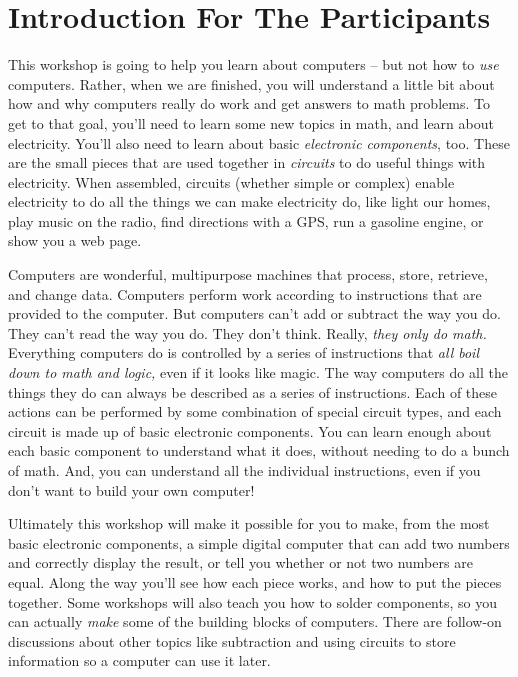 \section{Introduction For The Participants}

This workshop is going to help you learn about computers -- but not how to \emph{use} computers. Rather, when we are finished, you will understand a little bit about how and why computers really do work and get answers to math problems. To get to that goal, you'll need to learn some new topics in math, and learn about electricity. You'll also need to learn about basic \emph{electronic components}, too. These are the small pieces that are used together in \emph{circuits} to do useful things with electricity. When assembled, circuits (whether simple or complex) enable electricity to do all the things we can make electricity do, like light our homes, play music on the radio, find directions with a GPS, run a gasoline engine, or show you a web page.

Computers are wonderful, multipurpose machines that process, store, retrieve, and change data. Computers perform work according to instructions that are provided to the computer. But computers can't add or subtract the way you do. They can't read the way you do. They don't think. Really,  \emph{they only do math.} Everything computers do is controlled by a series of instructions that \emph{all boil down to math and logic,} even if it looks like magic. The way computers do all the things they do can always be described as a series of instructions. Each of these actions can be performed by some combination of special circuit types, and each circuit is made up of basic electronic components. You can learn enough about each basic component to understand what it does, without needing to do a bunch of math. And, you can understand all the individual instructions, even if you don't want to build your own computer!

Ultimately this workshop will make it possible for you to make, from the most basic electronic components, a simple digital computer that can add two numbers and correctly display the result, or tell you whether or not two numbers are equal. Along the way you'll see how each piece works, and how to put the pieces together. Some workshops will also teach you how to solder components, so you can actually \emph{make} some of the building blocks of computers. There are follow-on discussions about other topics like subtraction and using circuits to store information so a computer can use it later.

